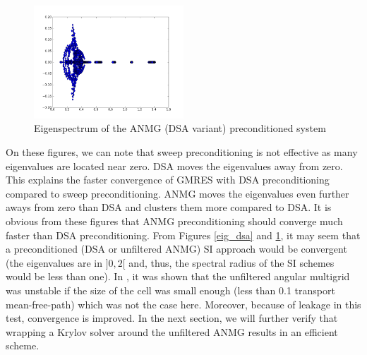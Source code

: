 \begin{figure}[H]
  \centering
  \includegraphics[width=0.5\textwidth]{./Anmg/p_s8_5_5}
  \caption{Eigenspectrum of the ANMG (DSA variant) preconditioned system}
  \label{eig_anmg}
\end{figure}
On these figures, we can note that sweep preconditioning is not effective as
many eigenvalues are located near zero. DSA moves the eigenvalues away from
zero. This explains the faster convergence of GMRES with DSA preconditioning
compared to sweep preconditioning. ANMG moves the eigenvalues even further
aways from zero than DSA and clusters them more compared to DSA. It is obvious
from these figures that ANMG preconditioning should converge much faster than
DSA preconditioning. From Figures \ref{eig_dsa} and \ref{eig_anmg}, it
  may seem that a preconditioned (DSA or unfiltered ANMG) SI approach
  would be convergent (the eigenvalues are in $]0,2[$ and, thus, the spectral
    radius of the SI schemes would be less than one). In
  \cite{shawn_phd}, it was shown that the unfiltered angular multigrid was
  unstable if the size of the cell was small enough (less than 0.1
  transport mean-free-path) which was not the case here. Moreover, because of
  leakage in this test, convergence is improved. In the next section, 
  we will further verify that wrapping a Krylov solver around the unfiltered ANMG
results in an efficient scheme.
